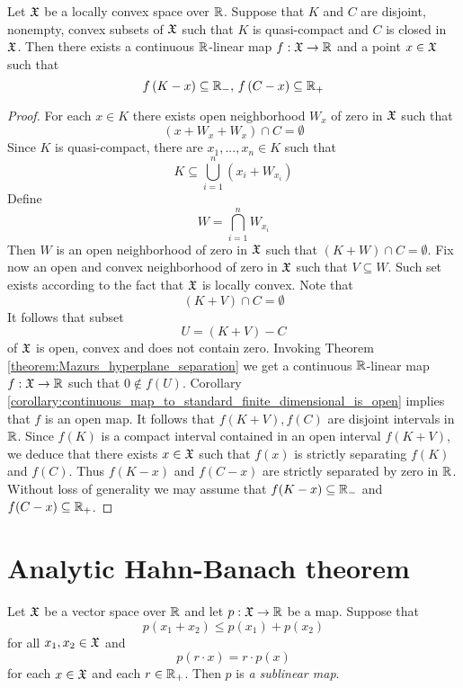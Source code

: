 \documentclass[10pt]{amsart}
\begin{document}
\begin{theorem}\label{theorem:separation_in_locally_convex_spaces}
	Let ${\mathfrak X}$ be a locally convex space over ${\mathbb R}$. Suppose that $K$ and $C$ are disjoint, nonempty, convex subsets of ${\mathfrak X}$ such that $K$ is quasi-compact and $C$ is closed in ${\mathfrak X}$. Then there exists a continuous ${\mathbb R}$-linear map $f:{\mathfrak X}\rightarrow {\mathbb R}$ and a point $x \in {\mathfrak X}$ such that
	$$f\left(K - x\right) \subseteq {\mathbb R}_-,\,f\left(C - x\right)\subseteq {\mathbb R}_+$$
\end{theorem}
\begin{proof}
	For each $x \in K$ there exists open neighborhood $W_x$ of zero in ${\mathfrak X}$ such that
	$$\left(x + W_x + W_x\right)\cap C = \emptyset$$
	Since $K$ is quasi-compact, there are $x_1,...,x_n\in K$ such that
	$$K \subseteq \bigcup_{i=1}^n\left(x_i + W_{x_i}\right)$$
	Define
	$$W = \bigcap_{i=1}^nW_{x_i}$$
	Then $W$ is an open neighborhood of zero in ${\mathfrak X}$ such that $\left(K + W\right)\cap C = \emptyset$. Fix now an open and convex neighborhood of zero in ${\mathfrak X}$ such that $V \subseteq W$. Such set exists according to the fact that ${\mathfrak X}$ is locally convex. Note that
	$$\left(K + V\right)\cap C = \emptyset$$
	It follows that subset
	$$U = \left(K + V\right) - C$$
	of ${\mathfrak X}$ is open, convex and does not contain zero. Invoking Theorem \ref{theorem:Mazurs_hyperplane_separation} we get a continuous ${\mathbb R}$-linear map $f:{\mathfrak X} \rightarrow {\mathbb R}$ such that $0 \not \in f\left(U\right)$. Corollary \ref{corollary:continuous_map_to_standard_finite_dimensional_is_open} implies that $f$ is an open map. It follows that $f\left(K + V\right),f\left(C\right)$ are disjoint intervals in ${\mathbb R}$. Since $f(K)$ is a compact interval contained in an open interval $f(K + V)$, we deduce that there exists $x \in {\mathfrak X}$ such that $f(x)$ is strictly separating $f\left(K\right)$ and $f\left(C\right)$. Thus $f(K - x)$ and $f(C - x)$ are strictly separated by zero in ${\mathbb R}$. Without loss of generality we may assume that $f(K - x) \subseteq {\mathbb R}_-$ and $f(C - x)\subseteq {\mathbb R}_+$.
\end{proof}

\section{Analytic Hahn-Banach theorem}

\begin{definition}
	Let ${\mathfrak X}$ be a vector space over ${\mathbb R}$ and let $p:{\mathfrak X}\rightarrow {\mathbb R}$ be a map. Suppose that
	$$p(x_1 + x_2)\leq p(x_1) + p(x_2)$$
	for all $x_1,x_2\in {\mathfrak X}$ and
	$$p(r\cdot x) = r\cdot p(x)$$
	for each $x\in {\mathfrak X}$ and each $r\in {\mathbb R}_+$. Then $p$ is \textit{a sublinear map}.
\end{definition}
\end{document}
